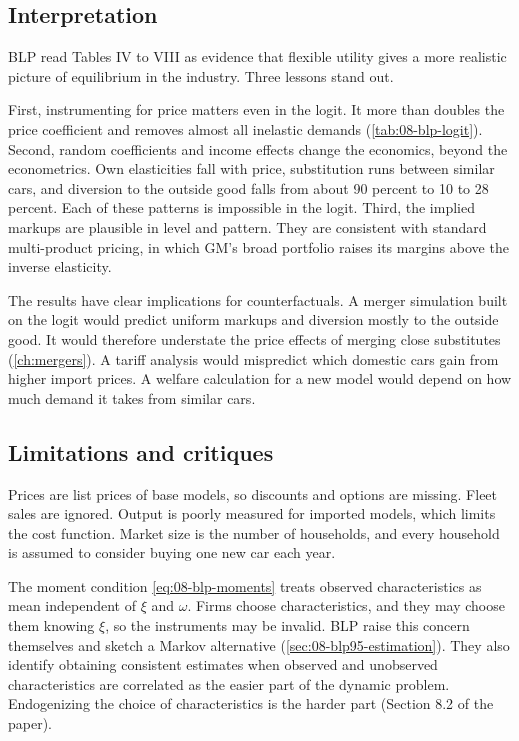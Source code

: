 \subsection{Interpretation}\label{sec:08-blp95-interp}

BLP read Tables IV to VIII as evidence that flexible utility gives a more realistic picture of
equilibrium in the industry. Three lessons stand out.

First, instrumenting for price matters even in the logit. It more than doubles the price coefficient
and removes almost all inelastic demands (\cref{tab:08-blp-logit}). Second, random coefficients and
income effects change the economics, beyond the econometrics. Own elasticities fall with price,
substitution runs between similar cars, and diversion to the outside good falls from about 90 percent to
10 to 28 percent. Each of these patterns is impossible in the logit. Third, the implied markups are
plausible in level and pattern. They are consistent with standard multi-product pricing, in which GM's
broad portfolio raises its margins above the inverse elasticity.

The results have clear implications for counterfactuals. A merger simulation built on the logit would
predict uniform markups and diversion mostly to the outside good. It would therefore understate the
price effects of merging close substitutes (\cref{ch:mergers}). A tariff analysis would mispredict which
domestic cars gain from higher import prices. A welfare calculation for a new model would depend on how
much demand it takes from similar cars.

\subsection{Limitations and critiques}\label{sec:08-blp95-critique}

Prices are list prices of base models, so discounts and options are missing. Fleet sales are ignored.
Output is poorly measured for imported models, which limits the cost function. Market size is the number
of households, and every household is assumed to consider buying one new car each year.

The moment condition \eqref{eq:08-blp-moments} treats observed characteristics as mean independent of
$\xi$ and $\omega$. Firms choose characteristics, and they may choose them knowing $\xi$, so the
instruments may be invalid. BLP raise this concern themselves and sketch a Markov alternative
(\cref{sec:08-blp95-estimation}). They also identify obtaining consistent estimates when observed and
unobserved characteristics are correlated as the easier part of the dynamic problem. Endogenizing the
choice of characteristics is the harder part (Section 8.2 of the paper).

